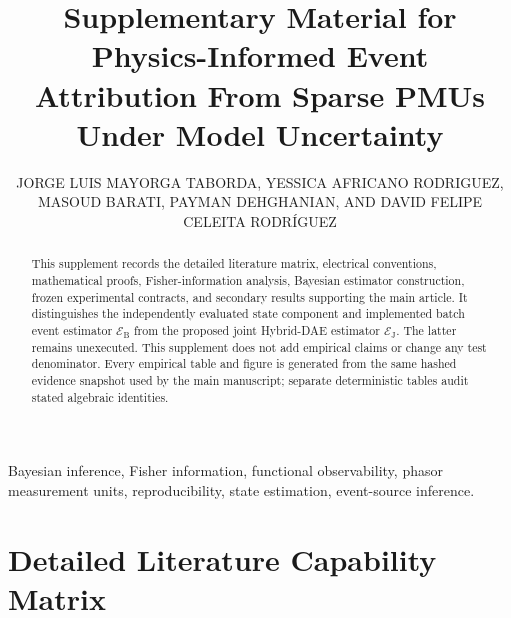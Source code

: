 \documentclass{ieeeaccess}
\begin{document}
\history{}
\doi{}
\title{Supplementary Material for Physics-Informed Event Attribution From Sparse PMUs Under Model Uncertainty}
\author{\uppercase{Jorge Luis Mayorga Taborda}, \uppercase{Yessica Africano Rodriguez}, \uppercase{Masoud Barati}, \uppercase{Payman Dehghanian}, AND \uppercase{David Felipe Celeita Rodr\'iguez}}
\address[1]{Universidad de los Andes, Bogot\'a, Colombia}
\address[2]{Department of Electrical and Computer Engineering, University of Pittsburgh, Pittsburgh, PA, USA}
\address[3]{Department of Electrical and Computer Engineering, The George Washington University, Washington, DC, USA}
\address[4]{Faculty of Engineering, Universidad de La Sabana, Ch\'ia, Colombia}

\begin{abstract}
This supplement records the detailed literature matrix, electrical conventions, mathematical proofs, Fisher-information analysis, Bayesian estimator construction, frozen experimental contracts, and secondary results supporting the main article. It distinguishes the independently evaluated state component and implemented batch event estimator $\mathcal E_{\mathrm B}$ from the proposed joint Hybrid-DAE estimator $\mathcal E_{\mathrm J}$. The latter remains unexecuted. This supplement does not add empirical claims or change any test denominator. Every empirical table and figure is generated from the same hashed evidence snapshot used by the main manuscript; separate deterministic tables audit stated algebraic identities.
\end{abstract}
\begin{keywords}
Bayesian inference, Fisher information, functional observability, phasor measurement units, reproducibility, state estimation, event-source inference.
\end{keywords}
\titlepgskip=-21pt
\maketitle

\appendices

\section{Detailed Literature Capability Matrix}
\end{document}
